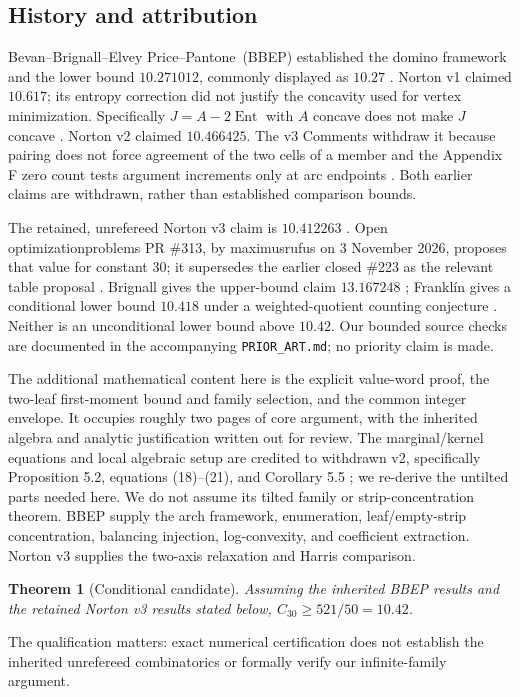 \documentclass[11pt]{amsart}
\numberwithin{equation}{section}
\newtheorem{theorem}{Theorem}[section]
\theoremstyle{remark}\newtheorem{remark}[theorem]{Remark}
\newcommand{\bbep}{Bevan--Brignall--Elvey Price--Pantone}
\begin{document}
\subsection*{History and attribution}
\bbep\ (BBEP) established the domino framework and the lower bound $10.271012$, commonly displayed as $10.27$ \cite[Theorem 7.1]{BBEP}. Norton v1 claimed $10.617$; its entropy correction did not justify the concavity used for vertex minimization. Specifically $J=A-2\operatorname{Ent}$ with $A$ concave does not make $J$ concave \cite[equation (43), Proposition 7.2]{N1}. Norton v2 claimed $10.466425$. The v3 Comments withdraw it because pairing does not force agreement of the two cells of a member and the Appendix F zero count tests argument increments only at arc endpoints \cite{N3comments}. Both earlier claims are withdrawn, rather than established comparison bounds.

The retained, unrefereed Norton v3 claim is $10.412263$ \cite[Theorem 1.1]{N3}. Open optimizationproblems PR \#313, by maximusrufus on 3 November 2026, proposes that value for constant 30; it supersedes the earlier closed \#223 as the relevant table proposal \cite{PR313}. Brignall gives the upper-bound claim $13.167248$ \cite{Brignall}; Frankl\'in gives a conditional lower bound $10.418$ under a weighted-quotient counting conjecture \cite{Franklin}. Neither is an unconditional lower bound above $10.42$. Our bounded source checks are documented in the accompanying \texttt{PRIOR\_ART.md}; no priority claim is made.

The additional mathematical content here is the explicit value-word proof, the two-leaf first-moment bound and family selection, and the common integer envelope. It occupies roughly two pages of core argument, with the inherited algebra and analytic justification written out for review. The marginal/kernel equations and local algebraic setup are credited to withdrawn v2, specifically Proposition 5.2, equations (18)--(21), and Corollary 5.5 \cite{N2}; we re-derive the untilted parts needed here. We do not assume its tilted family or strip-concentration theorem. BBEP supply the arch framework, enumeration, leaf/empty-strip concentration, balancing injection, log-convexity, and coefficient extraction. Norton v3 supplies the two-axis relaxation and Harris comparison.

\begin{theorem}[Conditional candidate]\label{thm:main}
Assuming the inherited BBEP results and the retained Norton v3 results stated below, $C_{30}\geq 521/50=10.42$.
\end{theorem}
The qualification matters: exact numerical certification does not establish the inherited unrefereed combinatorics or formally verify our infinite-family argument.
\end{document}
